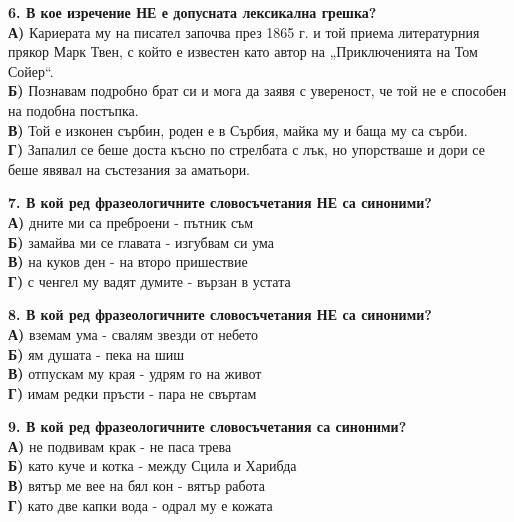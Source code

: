 \documentclass[12pt,a4paper]{article}
\begin{document}
\vspace{0.6cm}

\noindent
\textbf{6. В кое изречение НЕ е допусната лексикална грешка?} \\
\noindent
\textbf{А)} Кариерата му на писател започва през 1865 г. и той приема литературния прякор Марк Твен, с който е известен като автор на „Приключенията на Том Сойер“. \\
\textbf{Б)} Познавам подробно брат си и мога да заявя с увереност, че той не е способен на подобна постъпка. \\
\textbf{В)} Той е изконен сърбин, роден е в Сърбия, майка му и баща му са сърби. \\
\textbf{Г)} Запалил се беше доста късно по стрелбата с лък, но упорстваше и дори се беше явявал на състезания за аматьори.

\vspace{0.6cm}

\noindent
\textbf{7. В кой ред фразеологичните словосъчетания НЕ са синоними?} \\
\noindent
\textbf{А)} дните ми са преброени - пътник съм \\
\textbf{Б)} замайва ми се главата - изгубвам си ума \\
\textbf{В)} на куков ден - на второ пришествие \\
\textbf{Г)} с ченгел му вадят думите - вързан в устата

\vspace{0.6cm}

\noindent
\textbf{8. В кой ред фразеологичните словосъчетания НЕ са синоними?} \\
\noindent
\textbf{А)} вземам ума - свалям звезди от небето \\
\textbf{Б)} ям душата - пека на шиш \\
\textbf{В)} отпускам му края - удрям го на живот \\
\textbf{Г)} имам редки пръсти - пара не свъртам

\vspace{0.6cm}

\noindent
\textbf{9. В кой ред фразеологичните словосъчетания са синоними?} \\
\noindent
\textbf{А)} не подвивам крак - не паса трева \\
\textbf{Б)} като куче и котка - между Сцила и Харибда \\
\textbf{В)} вятър ме вее на бял кон - вятър работа \\
\textbf{Г)} като две капки вода - одрал му е кожата
\end{document}
